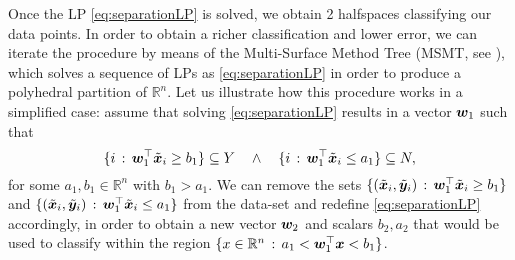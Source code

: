 Once the LP \eqref{eq:separationLP} is solved, we obtain 2 halfspaces classifying our data points. In order to obtain a richer classification and lower error, we can iterate the procedure by means of the Multi-Surface Method Tree (MSMT, see \cite{bennett1992decision}), which solves a sequence of LPs as \eqref{eq:separationLP} in order to produce a polyhedral partition of $\mathbb{R}^n$. Let us illustrate how this procedure works in a simplified case: assume that solving \eqref{eq:separationLP} results in a vector ${\bm{w}}_1$ such that
%
\[\{i \,: \, {\bm{w}}_1^\top \tilde{{\bm{x}}}_i \geq b_1 \} \subseteq Y\quad \land \quad \{i \,: \, {\bm{w}}_1^\top \tilde{{\bm{x}}}_i \leq a_1 \} \subseteq N, \]
%
for some $a_1,b_1\in\mathbb{R}^n$ with $b_1 > a_1$. We can remove the sets $\{(\tilde{{\bm{x}}}_i, \tilde{{\bm{y}}}_i) \,: \, {\bm{w}}_1^\top \tilde{{\bm{x}}}_i \geq b_1 \}$ and $\{(\tilde{{\bm{x}}}_i, \tilde{{\bm{y}}}_i) \,: \, {\bm{w}}_1^\top \tilde{{\bm{x}}}_i \leq a_1 \}$ from the data-set and redefine \eqref{eq:separationLP} accordingly, in order to obtain a new vector ${\bm{w}}_2$ and scalars $b_2,a_2$ that would be used to classify within the region $\{x\in \mathbb{R}^n \,: \,  a_1 < {\bm{w}}_1^\top {\bm{x}} < b_1 \}$.

